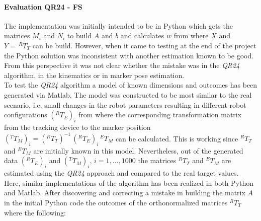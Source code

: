 \documentclass[conference]{IEEEtran}
\begin{document}
\paragraph{Evaluation QR24 - FS}
The implementation was initially intended to be in Python which gets the matrices \(M_i\) and \(N_i\) to build \(A\) and \(b\) and calculates \(w\) from where \(X\) and \(Y=\,^RT_T\) can be build. However, when it came to testing at the end of the project the Python solution was inconsistent with another estimation known to be good. From this perspective it was not clear whether the mistake was in the \textit{QR24} algorithm, in the kinematics or in marker pose estimation.\\
To test the \textit{QR24} algorithm a model of known dimensions and outcomes has been generated via Matlab. The model was constructed to be most similar to the real scenario, i.e. small changes in the robot parameters resulting in different robot configurations \((^RT_E)_i\) from where the corresponding transformation matrix from the tracking device to the marker position \((^TT_M)_i = (^RT_T)^{-1}\, (^RT_E)_i\,^ET_M\) can be calculated. This is working since \(^RT_T\) and \(^ET_M\) are initially known in this model. Nevertheless, out of the generated data \((^RT_E)_i\) and \((^TT_M)_i,\,i=1,\dots,1000\) the matrices \(^RT_T\) and \(^ET_M\) are estimated using the \textit{QR24} approach and compared to the real target values. \\
Here, similar implementations of the algorithm has been realized in both Python and Matlab. After discovering and correcting a mistake in  building the matrix \(A\) in the initial Python code the outcomes of the orthonormalized matrices \(^RT_T\) where the following:
\end{document}
